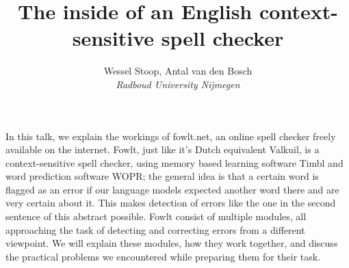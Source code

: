 \documentclass[12pt]{article}
\title{The inside of an English context-sensitive spell checker}
\author{Wessel Stoop, Antal van den Bosch\\ \emph{Radboud University Nijmegen}}
\begin{document}
\maketitle

In this talk, we explain the workings of fowlt.net, an online spell checker freely available on the internet. Fowlt, just like it's Dutch equivalent Valkuil, is a context-sensitive spell checker, using memory based learning software Timbl and word prediction software WOPR; the general idea is that a certain word is flagged as an error if our language models expected another word there and are very certain about it. This makes detection of errors like the one in the second sentence of this abstract possible. Fowlt consist of multiple modules, all approaching the task of detecting and correcting errors from a different viewpoint. We will explain these modules, how they work together, and discuss the practical problems we encountered while preparing them for their task. 
\end{document}
